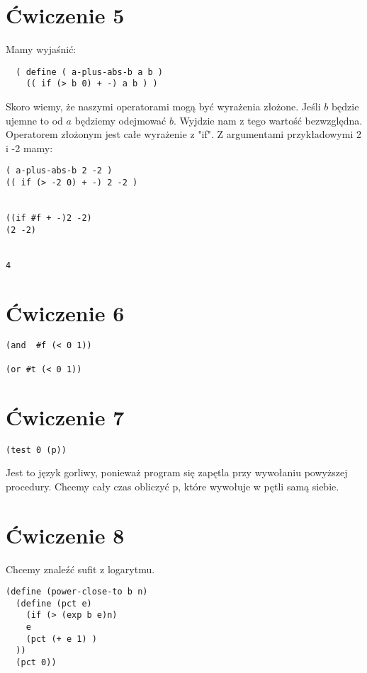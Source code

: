 \documentclass[a4paper]{article}
\begin{document}
\section{Ćwiczenie 5}
Mamy wyjaśnić:
\begin{lstlisting}
  ( define ( a-plus-abs-b a b )
    (( if (> b 0) + -) a b ) )
\end{lstlisting}
Skoro wiemy, że naszymi operatorami mogą być wyrażenia złożone. Jeśli $b$ będzie ujemne to od $a$ będziemy odejmować $b$. Wyjdzie nam z tego wartość bezwzględna. Operatorem złożonym jest całe wyrażenie z "if". Z argumentami przykładowymi 2 i -2 mamy:
\begin{lstlisting}
( a-plus-abs-b 2 -2 )
(( if (> -2 0) + -) 2 -2 )


((if #f + -)2 -2)
(2 -2)


4
\end{lstlisting} 
\section{Ćwiczenie 6}

\begin{lstlisting}
(and  #f (< 0 1))

(or #t (< 0 1))
\end{lstlisting}
\section{Ćwiczenie 7}
\begin{lstlisting}
(test 0 (p))
\end{lstlisting}
Jest to język gorliwy, ponieważ program się zapętla przy wywołaniu powyższej procedury. Chcemy cały czas obliczyć p, które wywołuje w pętli samą siebie.
\section{Ćwiczenie 8}
Chcemy znaleźć sufit z logarytmu.
\begin{lstlisting}
(define (power-close-to b n)
  (define (pct e)
    (if (> (exp b e)n)
    e
    (pct (+ e 1) )
  ))
  (pct 0))
\end{lstlisting}
\end{document}
